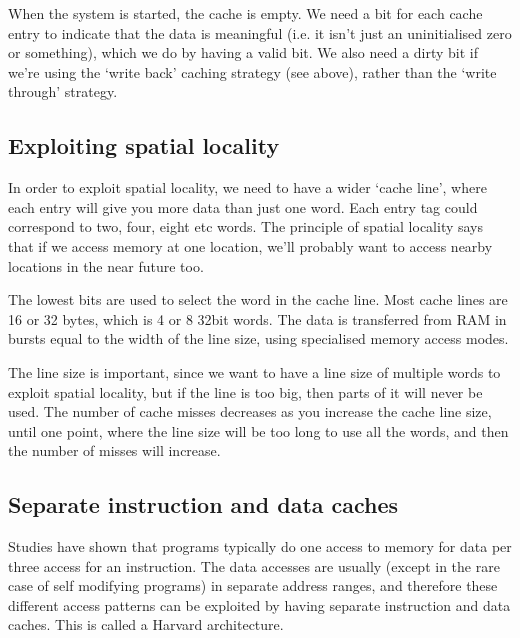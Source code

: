When the system is started, the cache is empty. We need a bit for each cache
entry to indicate that the data is meaningful (i.e. it isn't just an
uninitialised zero or something), which we do by having a valid bit. We also
need a dirty bit if we're using the `write back' caching strategy (see above),
rather than the `write through' strategy.

\subsection{Exploiting spatial locality}

In order to exploit spatial locality, we need to have a wider `cache line',
where each entry will give you more data than just one word. Each entry tag
could correspond to two, four, eight etc words. The principle of spatial
locality says that if we access memory at one location, we'll probably want to
access nearby locations in the near future too.


The lowest bits are used to select the word in the cache line. Most cache lines
are 16 or 32 bytes, which is 4 or 8 32bit words. The data is transferred from
RAM in bursts equal to the width of the line size, using specialised memory
access modes.


The line size is important, since we want to have a line size of multiple words
to exploit spatial locality, but if the line is too big, then parts of it will
never be used. The number of cache misses decreases as you increase the cache
line size, until one point, where the line size will be too long to use all the
words, and then the number of misses will increase.

\subsection{Separate instruction and data caches}

Studies have shown that programs typically do one access to memory for data per
three access for an instruction. The data accesses are usually (except in the
rare case of self modifying programs) in separate address ranges, and therefore
these different access patterns can be exploited by having separate instruction
and data caches. This is called a Harvard architecture.

